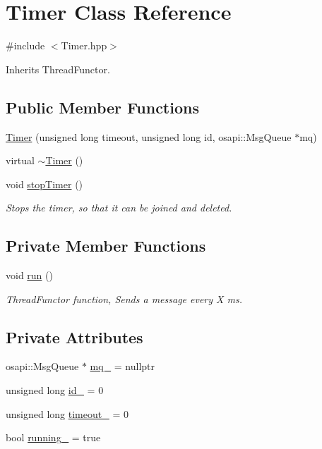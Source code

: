 \hypertarget{class_timer}{}\section{Timer Class Reference}
\label{class_timer}


{\ttfamily \#include $<$Timer.\+hpp$>$}



Inherits Thread\+Functor.

\subsection*{Public Member Functions}
\begin{DoxyCompactItemize}
\item 
\hyperlink{class_timer_a430e1b903802ec44b560a56dad510751}{Timer} (unsigned long timeout, unsigned long id, osapi\+::\+Msg\+Queue $\ast$mq)
\item 
virtual \hyperlink{class_timer_a14fa469c4c295c5fa6e66a4ad1092146}{$\sim$\+Timer} ()
\item 
void \hyperlink{class_timer_a27f97da1b1d19ad74a847703ca25c455}{stop\+Timer} ()
\begin{DoxyCompactList}\small\item\em Stops the timer, so that it can be joined and deleted. \end{DoxyCompactList}\end{DoxyCompactItemize}
\subsection*{Private Member Functions}
\begin{DoxyCompactItemize}
\item 
void \hyperlink{class_timer_a1323444ebd7f2c1407518a03a193b5f4}{run} ()
\begin{DoxyCompactList}\small\item\em Thread\+Functor function, Sends a message every X ms. \end{DoxyCompactList}\end{DoxyCompactItemize}
\subsection*{Private Attributes}
\begin{DoxyCompactItemize}
\item 
osapi\+::\+Msg\+Queue $\ast$ \hyperlink{class_timer_af8eb86ca8b96b4c88c3c0b8c09d88e9a}{mq\+\_\+} = nullptr
\item 
unsigned long \hyperlink{class_timer_aaf66e97fe49e0657c3c2c1984ac14fe1}{id\+\_\+} = 0
\item 
unsigned long \hyperlink{class_timer_a474478436edc2312ce9d0a375aff403a}{timeout\+\_\+} = 0
\item 
bool \hyperlink{class_timer_af78e657414c25836212454891b20f0ad}{running\+\_\+} = true
\end{DoxyCompactItemize}


